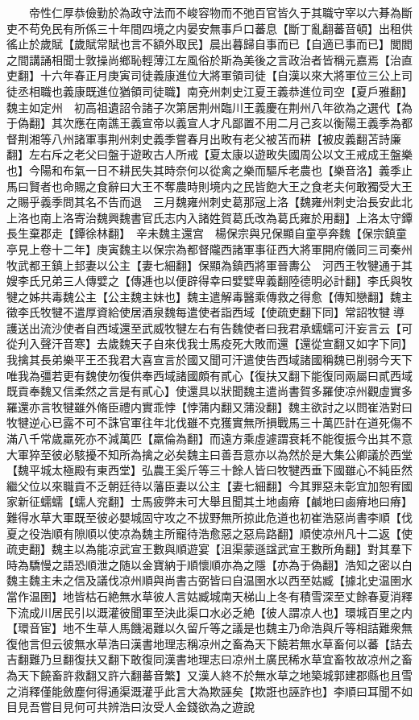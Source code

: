 　　帝性仁厚恭儉勤於為政守法而不峻容物而不弛百官皆久于其職守宰以六朞為斷吏不苟免民有所係三十年間四境之内晏安無事戶口蕃息【斷丁亂翻蕃音頓】出租供徭止於歲賦【歲賦常賦也言不額外取民】晨出暮歸自事而已【自適已事而已】閭閻之間講誦相聞士敦操尚鄉恥輕薄江左風俗於斯為美後之言政治者皆稱元嘉焉【治直吏翻】十六年春正月庚寅司徒義康進位大將軍領司徒【自漢以來大將軍位三公上司徒丞相職也義康既進位猶領司徒職】南兗州刺史江夏王義恭進位司空【夏戶雅翻】　魏主如定州　初高祖遺詔令諸子次第居荆州臨川王義慶在荆州八年欲為之選代【為于偽翻】其次應在南譙王義宣帝以義宣人才凡鄙置不用二月己亥以衡陽王義季為都督荆湘等八州諸軍事荆州刺史義季嘗春月出畋有老父被苫而耕【被皮義翻苫詩廉翻】左右斥之老父曰盤于遊畋古人所戒【夏太康以遊畋失國周公以文王戒成王盤樂也】今陽和布氣一日不耕民失其時奈何以從禽之樂而驅斥老農也【樂音洛】義季止馬曰賢者也命賜之食辭曰大王不奪農時則境内之民皆飽大王之食老夫何敢獨受大王之賜乎義季問其名不告而退　三月魏雍州刺史葛那宼上洛【魏雍州刺史治長安此北上洛也南上洛寄治魏興魏書官氏志内入諸姓賀葛氏改為葛氏雍於用翻】上洛太守鐔長生棄郡走【鐔徐林翻】　辛未魏主還宫　楊保宗與兄保顯自童亭奔魏【保宗鎮童亭見上卷十二年】庚寅魏主以保宗為都督隴西諸軍事征西大將軍開府儀同三司秦州牧武都王鎮上邽妻以公主【妻七細翻】保顯為鎮西將軍晉夀公　河西王牧犍通于其嫂李氏兄弟三人傳嬖之【傳逓也以便辟得幸曰嬖嬖卑義翻陸德明必計翻】李氏與牧犍之姊共毒魏公主【公主魏主妹也】魏主遣解毒醫乘傳救之得愈【傳知戀翻】魏主徵李氏牧犍不遣厚資給使居酒泉魏每遣使者詣西域【使疏吏翻下同】常詔牧犍導護送出流沙使者自西域還至武威牧犍左右有告魏使者曰我君承蠕蠕可汗妄言云【可從刋入聲汗音寒】去歲魏天子自來伐我士馬疫死大敗而還【還從宣翻又如字下同】我擒其長弟樂平王丕我君大喜宣言於國又聞可汗遣使告西域諸國稱魏已削弱今天下唯我為彊若更有魏使勿復供奉西域諸國頗有貳心【復扶又翻下能復同兩屬曰貳西域既貢奉魏又信柔然之言是有貳心】使還具以狀聞魏主遣尚書賀多羅使凉州觀虛實多羅還亦言牧犍雖外脩臣禮内實乖悖【悖蒲内翻又蒲没翻】魏主欲討之以問崔浩對曰牧犍逆心已露不可不誅官軍往年北伐雖不克獲實無所損戰馬三十萬匹計在道死傷不滿八千常歲羸死亦不減萬匹【羸倫為翻】而遠方乘虛遽謂衰耗不能復振今出其不意大軍猝至彼必駭擾不知所為擒之必矣魏主曰善吾意亦以為然於是大集公卿議於西堂【魏平城太極殿有東西堂】弘農王奚斤等三十餘人皆曰牧犍西垂下國雖心不純臣然繼父位以來職貢不乏朝廷待以藩臣妻以公主【妻七細翻】今其罪惡未彰宜加恕宥國家新征蠕蠕【蠕人兖翻】士馬疲弊未可大舉且聞其土地鹵瘠【鹹地曰鹵瘠地曰瘠】難得水草大軍既至彼必嬰城固守攻之不拔野無所掠此危道也初崔浩惡尚書李順【伐夏之役浩順有隙順以使凉為魏主所寵待浩愈惡之惡烏路翻】順使凉州凡十二返【使疏吏翻】魏主以為能凉武宣王數與順遊宴【沮渠蒙遜諡武宣王數所角翻】對其羣下時為驕慢之語恐順泄之随以金寶納于順懷順亦為之隱【亦為于偽翻】浩知之密以白魏主魏主未之信及議伐凉州順與尚書古弼皆曰自温圉水以西至姑臧【據北史温圉水當作温圉】地皆枯石絶無水草彼人言姑臧城南天梯山上冬有積雪深至丈餘春夏消釋下流成川居民引以溉灌彼聞軍至決此渠口水必乏絶【彼人謂凉人也】環城百里之内【環音宦】地不生草人馬饑渴難以久留斤等之議是也魏主乃命浩與斤等相詰難衆無復他言但云彼無水草浩曰漢書地理志稱凉州之畜為天下饒若無水草畜何以蕃【詰去吉翻難乃旦翻復扶又翻下敢復同漢書地理志曰凉州土廣民稀水草宜畜牧故凉州之畜為天下饒畜許救翻又許六翻蕃音繁】又漢人終不於無水草之地築城郭建郡縣也且雪之消釋僅能斂塵何得通渠溉灌乎此言大為欺誣矣【欺誑也誣詐也】李順曰耳聞不如目見吾嘗目見何可共辨浩曰汝受人金錢欲為之遊說